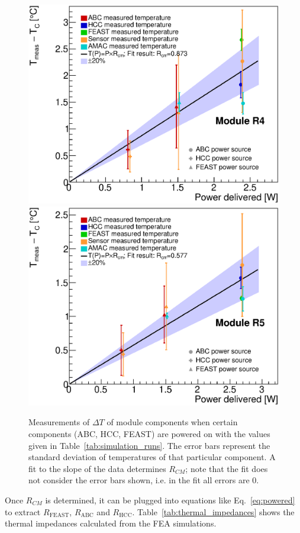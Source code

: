 \begin{figure}[ht!]
\includegraphics[width=0.49\linewidth]{figures/ThermalImpedanceFit_R4_Rcm.eps}
\includegraphics[width=0.49\linewidth]{figures/ThermalImpedanceFit_R5_Rcm.eps}
\caption{Measurements of $\Delta T$ of module components when certain components (ABC, HCC, FEAST)
are powered on with the values given in Table~\ref{tab:simulation_runs}. 
The error bars represent the standard deviation of temperatures of that particular
component. A fit to the slope of the data determines $R_{CM}$; note that the fit does not consider
the error bars shown, i.e. in the fit all errors are 0.
}
\label{rcm_fits}
\end{figure}

Once $R_{CM}$ is determined, it can be plugged into equations like Eq.~\ref{eq:powered} to extract
$R_\text{FEAST}$, $R_\text{ABC}$ and $R_\text{HCC}$.
Table~\ref{tab:thermal_impedances} shows the thermal impedances calculated
from the FEA simulations.

\def\insulabc{$(R\times n)_\text{ABC}$\xspace}
\def\insulhcc{$(R\times n)_\text{HCC}$\xspace}
\def\insulfeast{$(R\times n)_\text{FEAST}$\xspace}

